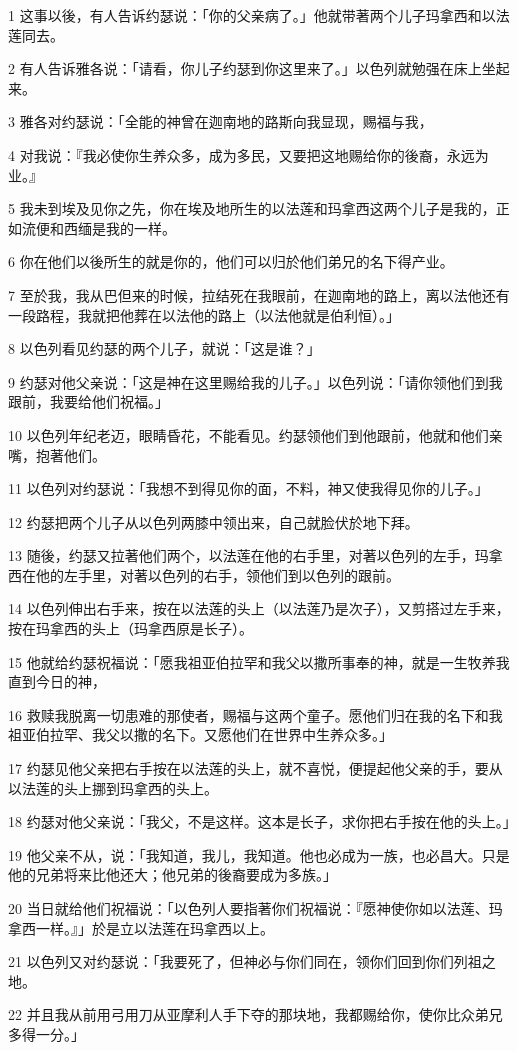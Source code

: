 \par 1 这事以後，有人告诉约瑟说：「你的父亲病了。」他就带著两个儿子玛拿西和以法莲同去。
\par 2 有人告诉雅各说：「请看，你儿子约瑟到你这里来了。」以色列就勉强在床上坐起来。
\par 3 雅各对约瑟说：「全能的神曾在迦南地的路斯向我显现，赐福与我，
\par 4 对我说：『我必使你生养众多，成为多民，又要把这地赐给你的後裔，永远为业。』
\par 5 我未到埃及见你之先，你在埃及地所生的以法莲和玛拿西这两个儿子是我的，正如流便和西缅是我的一样。
\par 6 你在他们以後所生的就是你的，他们可以归於他们弟兄的名下得产业。
\par 7 至於我，我从巴但来的时候，拉结死在我眼前，在迦南地的路上，离以法他还有一段路程，我就把他葬在以法他的路上（以法他就是伯利恒）。」
\par 8 以色列看见约瑟的两个儿子，就说：「这是谁？」
\par 9 约瑟对他父亲说：「这是神在这里赐给我的儿子。」以色列说：「请你领他们到我跟前，我要给他们祝福。」
\par 10 以色列年纪老迈，眼睛昏花，不能看见。约瑟领他们到他跟前，他就和他们亲嘴，抱著他们。
\par 11 以色列对约瑟说：「我想不到得见你的面，不料，神又使我得见你的儿子。」
\par 12 约瑟把两个儿子从以色列两膝中领出来，自己就脸伏於地下拜。
\par 13 随後，约瑟又拉著他们两个，以法莲在他的右手里，对著以色列的左手，玛拿西在他的左手里，对著以色列的右手，领他们到以色列的跟前。
\par 14 以色列伸出右手来，按在以法莲的头上（以法莲乃是次子），又剪搭过左手来，按在玛拿西的头上（玛拿西原是长子）。
\par 15 他就给约瑟祝福说：「愿我祖亚伯拉罕和我父以撒所事奉的神，就是一生牧养我直到今日的神，
\par 16 救赎我脱离一切患难的那使者，赐福与这两个童子。愿他们归在我的名下和我祖亚伯拉罕、我父以撒的名下。又愿他们在世界中生养众多。」
\par 17 约瑟见他父亲把右手按在以法莲的头上，就不喜悦，便提起他父亲的手，要从以法莲的头上挪到玛拿西的头上。
\par 18 约瑟对他父亲说：「我父，不是这样。这本是长子，求你把右手按在他的头上。」
\par 19 他父亲不从，说：「我知道，我儿，我知道。他也必成为一族，也必昌大。只是他的兄弟将来比他还大；他兄弟的後裔要成为多族。」
\par 20 当日就给他们祝福说：「以色列人要指著你们祝福说：『愿神使你如以法莲、玛拿西一样。』」於是立以法莲在玛拿西以上。
\par 21 以色列又对约瑟说：「我要死了，但神必与你们同在，领你们回到你们列祖之地。
\par 22 并且我从前用弓用刀从亚摩利人手下夺的那块地，我都赐给你，使你比众弟兄多得一分。」

